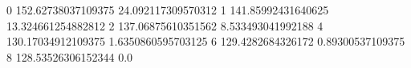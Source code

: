 0 152.62738037109375 24.092117309570312
1 141.85992431640625 13.324661254882812
2 137.06875610351562 8.533493041992188
4 130.17034912109375 1.6350860595703125
6 129.4282684326172 0.89300537109375
8 128.53526306152344 0.0
